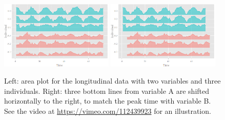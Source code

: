 \documentclass[12pt]{article}
\begin{document}


\begin{center}
\begin{figure}[htp]
\begin{centering}
\includegraphics[width=0.48\textwidth]{graph/pipeline-19-original}
\includegraphics[width=0.48\textwidth]{graph/pipeline-19-shifting}
\end{centering}
\caption{\label{fig:x-shifting}Left: area plot for the longitudinal data with
two variables and three individuals. Right: three bottom lines from
variable A are shifted horizontally to the right, to match the peak
time with variable B. See the video at \url{https://vimeo.com/112439923} for an illustration.}
\end{figure}
\end{center}
\end{document}
